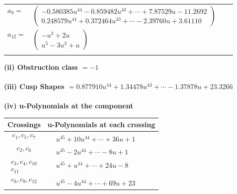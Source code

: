 \documentclass[1p]{elsarticle_modified}
\theoremstyle{definition}
\begin{document}
\begin{tabular}{m{7pt} m{180pt} m{7pt} m{180pt} }
\flushright $a_{9}=$&$\begin{pmatrix}-0.580385 u^{44}-0.859482 u^{43}+\cdots+7.87529 u-11.2692\\0.248579 u^{44}+0.372464 u^{43}+\cdots-2.39760 u+3.61110\end{pmatrix}$ \\
\flushright $a_{12}=$&$\begin{pmatrix}- u^3+2 u\\u^5-3 u^3+u\end{pmatrix}$\\&\end{tabular}
\flushleft \textbf{(ii) Obstruction class $= -1$}\\~\\
\flushleft \textbf{(iii) Cusp Shapes $= 0.877910 u^{44}+1.34478 u^{43}+\cdots-1.37878 u+23.3266$}\\~\\
\newpage\renewcommand{\arraystretch}{1}
\flushleft \textbf{(iv) u-Polynomials at the component}\newline \\
\begin{tabular}{m{50pt}|m{274pt}}
Crossings & \hspace{64pt}u-Polynomials at each crossing \\
\hline $$\begin{aligned}c_{1},c_{5},c_{7}\end{aligned}$$&$\begin{aligned}
&u^{45}+10 u^{44}+\cdots+36 u+1
\end{aligned}$\\
\hline $$\begin{aligned}c_{2},c_{6}\end{aligned}$$&$\begin{aligned}
&u^{45}-2 u^{44}+\cdots-8 u+1
\end{aligned}$\\
\hline $$\begin{aligned}c_{3},c_{4},c_{10}\\c_{11}\end{aligned}$$&$\begin{aligned}
&u^{45}+u^{44}+\cdots+24 u-8
\end{aligned}$\\
\hline $$\begin{aligned}c_{8},c_{9},c_{12}\end{aligned}$$&$\begin{aligned}
&u^{45}-4 u^{44}+\cdots+69 u+23
\end{aligned}$\\
\hline
\end{tabular}\\~\\
\end{document}
